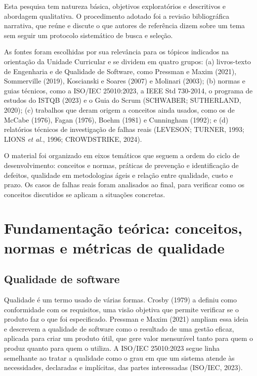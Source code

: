 \documentclass[12pt,a4paper]{article}
\begin{document}
Esta pesquisa tem natureza básica, objetivos exploratórios e descritivos e abordagem qualitativa. O procedimento adotado foi a revisão bibliográfica narrativa, que reúne e discute o que autores de referência dizem sobre um tema sem seguir um protocolo sistemático de busca e seleção.

As fontes foram escolhidas por sua relevância para os tópicos indicados na orientação da Unidade Curricular e se dividem em quatro grupos: (a) livros-texto de Engenharia e de Qualidade de Software, como Pressman e Maxim (2021), Sommerville (2019), Koscianski e Soares (2007) e Molinari (2003); (b) normas e guias técnicos, como a ISO/IEC 25010:2023, a IEEE Std 730-2014, o programa de estudos do ISTQB (2023) e o Guia do Scrum (SCHWABER; SUTHERLAND, 2020); (c) trabalhos que deram origem a conceitos ainda usados, como os de McCabe (1976), Fagan (1976), Boehm (1981) e Cunningham (1992); e (d) relatórios técnicos de investigação de falhas reais (LEVESON; TURNER, 1993; LIONS \textit{et al.}, 1996; CROWDSTRIKE, 2024).

O material foi organizado em eixos temáticos que seguem a ordem do ciclo de desenvolvimento: conceitos e normas, práticas de prevenção e identificação de defeitos, qualidade em metodologias ágeis e relação entre qualidade, custo e prazo. Os casos de falhas reais foram analisados ao final, para verificar como os conceitos discutidos se aplicam a situações concretas.

\section{Fundamentação teórica: conceitos, normas e métricas de qualidade}
\label{sec:fundamentacao}

\subsection{Qualidade de software}

Qualidade é um termo usado de várias formas. Crosby (1979) a definiu como conformidade com os requisitos, uma visão objetiva que permite verificar se o produto faz o que foi especificado. Pressman e Maxim (2021) ampliam essa ideia e descrevem a qualidade de software como o resultado de uma gestão eficaz, aplicada para criar um produto útil, que gere valor mensurável tanto para quem o produz quanto para quem o utiliza. A ISO/IEC 25010:2023 segue linha semelhante ao tratar a qualidade como o grau em que um sistema atende às necessidades, declaradas e implícitas, das partes interessadas (ISO/IEC, 2023).
\end{document}
